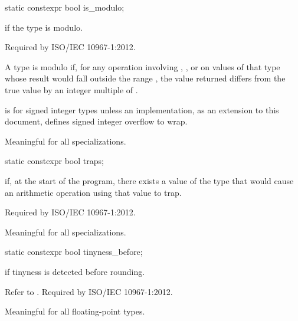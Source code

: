 %
\begin{itemdecl}
static constexpr bool is_modulo;
\end{itemdecl}

\begin{itemdescr}
\pnum
{} if the type is modulo.
\begin{footnote}
Required by ISO/IEC 10967-1:2012.
\end{footnote}
A type is modulo if, for any operation involving \tcode{+}, \tcode{-}, or
\tcode{*} on values of that type whose result would fall outside the range
, the value returned differs from the true value by an
integer multiple of .

\pnum
\begin{example}
 is  for signed integer types
unless an implementation, as an extension to this document,
defines signed integer overflow to wrap.
\end{example}

\pnum
Meaningful for all specializations.
\end{itemdescr}

%
\begin{itemdecl}
static constexpr bool traps;
\end{itemdecl}

\begin{itemdescr}
\pnum
{}
if, at the start of the program, there exists a value of the type that would cause
an arithmetic operation using that value to trap.
\begin{footnote}
Required by ISO/IEC 10967-1:2012.
\end{footnote}

\pnum
Meaningful for all specializations.
\end{itemdescr}

%
\begin{itemdecl}
static constexpr bool tinyness_before;
\end{itemdecl}

\begin{itemdescr}
\pnum
{}
if tinyness is detected before rounding.
\begin{footnote}
Refer to
\IsoFloatUndated{}.
Required by ISO/IEC 10967-1:2012.
\end{footnote}

\pnum
Meaningful for all floating-point types.
\end{itemdescr}

